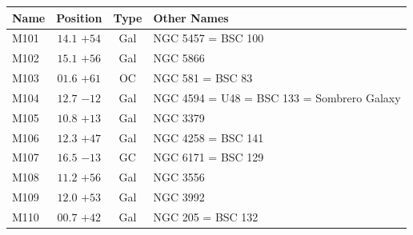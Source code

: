 \begin{table}[t]
    \setlength{\tabcolsep}{2pt}
    \footnotesize
    \begin{tabularx}{\linewidth}{lccX}
        \hline
        Name&Position&Type&Other Names\\
        \hline

M101 &$14.1$ $+54$&Gal&NGC 5457 = BSC 100\\
M102 &$15.1$ $+56$&Gal&NGC 5866\\
M103 &$01.6$ $+61$&OC &NGC 581 = BSC 83\\
M104 &$12.7$ $-12$&Gal&NGC 4594 = U48 = BSC 133 = Sombrero Galaxy\\
M105 &$10.8$ $+13$&Gal&NGC 3379\\
M106 &$12.3$ $+47$&Gal&NGC 4258 = BSC 141\\
M107 &$16.5$ $-13$&GC &NGC 6171 = BSC 129\\
M108 &$11.2$ $+56$&Gal&NGC 3556\\
M109 &$12.0$ $+53$&Gal&NGC 3992\\
M110 &$00.7$ $+42$&Gal&NGC 205 = BSC 132\\

        \hline
    \end{tabularx}
\end{table}
\clearpage

